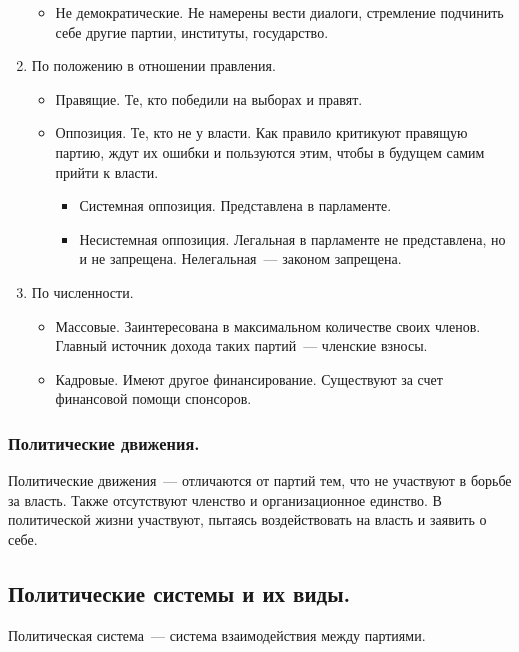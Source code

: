 \documentclass[12pt]{article}
\begin{document}
\begin{enumerate}
\begin{itemize}
			\item Не демократические. Не намерены вести диалоги, стремление подчинить себе другие партии, институты, государство.
		\end{itemize}
		\item По положению в отношении правления.
		\begin{itemize}
			\item Правящие. Те, кто победили на выборах и правят.
			\item Оппозиция. Те, кто не у власти. Как правило критикуют правящую партию, ждут их ошибки и пользуются этим, чтобы в будущем самим прийти к власти.
			\begin{itemize}
				\item Системная оппозиция. Представлена в парламенте.
				\item Несистемная оппозиция. Легальная в парламенте не представлена, но и не запрещена. Нелегальная~--- законом запрещена.
			\end{itemize}
		\end{itemize}
		\item По численности.
		\begin{itemize}
			\item Массовые. Заинтересована в максимальном количестве своих членов. Главный источник дохода таких партий~--- членские взносы.
			\item Кадровые. Имеют другое финансирование. Существуют за счет финансовой помощи спонсоров.
		\end{itemize}
	\end{enumerate}
	\subsubsection{Политические движения.}
	\begin{definition}
		Политические движения~--- отличаются от партий тем, что не участвуют в борьбе за власть. Также отсутствуют членство и организационное единство. В политической жизни участвуют, пытаясь воздействовать на власть и заявить о себе.
	\end{definition}
	\subsection{Политические системы и их виды.}
	\begin{definition}
		Политическая система~--- система взаимодействия между партиями.
	\end{definition}
\end{document}
